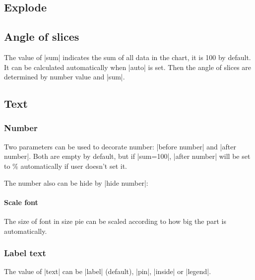 \documentclass{ltxdoc}
\begin{document}
\codeexample[scale=0.4,from file={demo/color.tex}]

\subsection{Explode}
\codeexample[scale=0.4,from file={demo/explode.tex}]

\subsection{Angle of slices}
The value of |sum| indicates the sum of all data in the chart,
it is 100 by default. It can be calculated automatically when
|auto| is set. Then the angle of slices are determined by
number value and |sum|.

\codeexample[scale=0.4,from file={demo/sum.tex}]

\subsection{Text}

\subsubsection{Number}
Two parameters can be used to decorate number: |before number|
and |after number|. Both are empty by default, but if
|sum=100|, |after number| will be set to \%
automatically if user doesn't set it.

\codeexample[scale=0.25,from file={demo/before-after-number.tex}]

The number also can be hide by |hide number|:

\codeexample[scale=0.25,from file={demo/hide-number.tex}]

\paragraph{Scale font}
The size of font in size pie can be scaled according to how big the
part is automatically.

\codeexample[scale=0.25,from file={demo/scalefont.tex}]

\subsubsection{Label text}
The value of |text| can be |label| (default),
|pin|, |inside| or |legend|.

\codeexample[scale=0.25,from file={demo/text.tex}]
\end{document}
